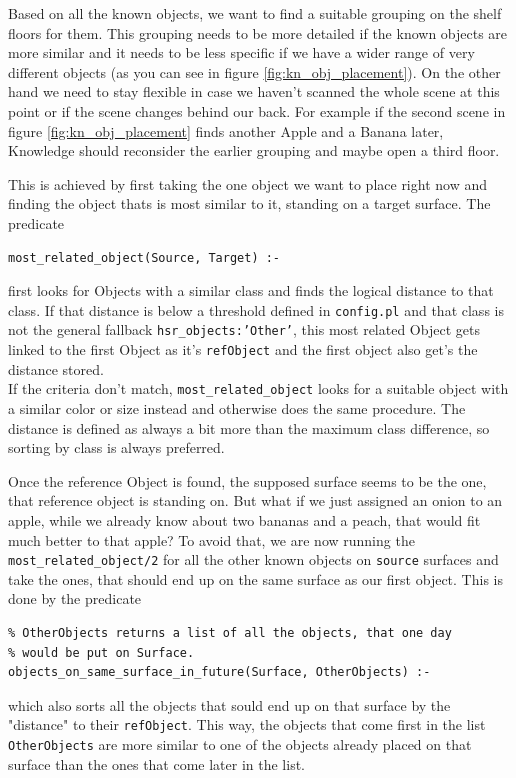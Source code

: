\documentclass[main.tex]{subfiles}
\begin{document}
Based on all the known objects, we want to find a suitable grouping on the shelf floors for them. This grouping needs to be more detailed if the known objects are more similar and it needs to be less specific if we have a wider range of very different objects (as you can see in figure \ref{fig:kn_obj_placement}). On the other hand we need to stay flexible in case we haven't scanned the whole scene at this point or if the scene changes behind our back. For example if the second scene in figure \ref{fig:kn_obj_placement} finds another Apple and a Banana later, Knowledge should reconsider the earlier grouping and maybe open a third floor.

This is achieved by first taking the one object we want to place right now and finding the object thats is most similar to it, standing on a target surface. The predicate
\begin{lstlisting}
most_related_object(Source, Target) :-
\end{lstlisting}
first looks for Objects with a similar class and finds the logical distance to that class. If that distance is below a threshold defined in \texttt{config.pl} and that class is not the general fallback \texttt{hsr\_objects:'Other'}, this most related Object gets linked to the first Object as it's \texttt{refObject} and the first object also get's the distance stored.\\
If the criteria don't match, \texttt{most\_related\_object} looks for a suitable object with a similar color or size instead and otherwise does the same procedure. The distance is defined as always a bit more than the maximum class difference, so sorting by class is always preferred.

Once the reference Object is found, the supposed surface seems to be the one, that reference object is standing on. But what if we just assigned an onion to an apple, while we already know about two bananas and a peach, that would fit much better to that apple? To avoid that, we are now running the \texttt{most\_related\_object/2} for all the other known objects on \texttt{source} surfaces and take the ones, that should end up on the same surface as our first object. This is done by the predicate
\begin{lstlisting}
% OtherObjects returns a list of all the objects, that one day 
% would be put on Surface.
objects_on_same_surface_in_future(Surface, OtherObjects) :-
\end{lstlisting}
which also sorts all the objects that sould end up on that surface by the "distance" to their \texttt{refObject}. This way, the objects that come first in the list \texttt{OtherObjects} are more similar to one of the objects already placed on that surface than the ones that come later in the list.
\end{document}
